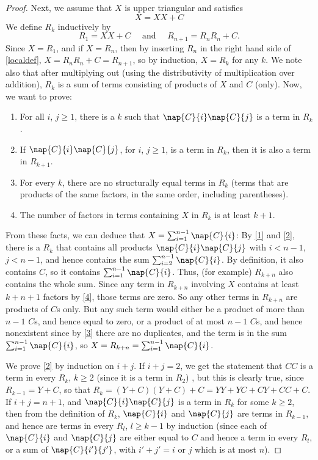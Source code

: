 \begin{proof}
   Next, we assume that $X$ is upper triangular and satisfies 
   \begin{equation*}
     \label{localdef}
     X = XX + C 
   \end{equation*}
   We define $R_k$ inductively by
   \begin{equation*}
     R_1 = XX + C \quad \text{ and } \quad R_{n + 1} = R_nR_n + C.
   \end{equation*}
   Since $X = R_1$, and if $X = R_n$, then by inserting $R_n$ in the right hand side of \eqref{localdef}, $X = R_nR_n + C = R_{n + 1}$, so by induction, $X = R_k$ for any $k$. We note also that after multiplying out (using the distributivity of multiplication over addition), $R_k$ is a sum of terms consisting of products of $X$ and $C$ (only). Now, we want to prove:
   \begin{enumerate}
   \item \label{1} For all $i$, $j \ge 1$, there is a $k$  such that $\nap{C}{i}\nap{C}{j}$ is a term in $R_k$.
   \item \label{2} If $\nap{C}{i}\nap{C}{j}$, for $i$, $j \ge 1$, is a term in $R_k$, then it is also a term in $R_{k + 1}$.
   \item \label{3} For every $k$, there are no structurally equal terms in $R_k$ (terms that are products of the same factors, in the same order, including parentheses).
   \item \label{4} The number of factors in terms containing $X$ in $R_k$ is at least $k + 1$. 
   \end{enumerate}
   From these facts, we can deduce that $X = \sum_{i = 1}^{n-1}\nap{C}{i}$: By \ref{1} and \ref{2}, there is a $R_k$ that contains all products $\nap{C}{i}\nap{C}{j}$ with $i < n - 1$, $j < n - 1$, and hence contains the sum $\sum_{i = 2}^{n-1}\nap{C}{i}$. By definition, it also contains $C$, so it contains $\sum_{i = 1}^{n-1}\nap{C}{i}$. Thus, (for example) $R_{k + n}$ also contains the whole sum. Since any term in $R_{k + n}$ involving $X$ contains at least $k + n + 1$ factors by \ref{4}, those terms are zero. So any other terms in $R_{k + n}$ are products of $C$s only. But any such term would either be a product of more than $n-1$  $C$s, and hence equal to zero, or a product of at most $n-1$ $C$s, and hence nonexistent since by \ref{3} there are no duplicates, and the term is in the sum $\sum_{i = 1}^{n-1}\nap{C}{i}$, so $X = R_{k + n} = \sum_{i = 1}^{n-1}\nap{C}{i}$.

We prove \ref{2} by induction on $i + j$. If $i+j = 2$, we get the statement that $CC$ is a term in every $R_k$, $k \ge 2$ (since it is a term in $R_2$) , but this is clearly true, since $R_{k - 1} = Y + C$, so that $R_{k} = (Y + C)(Y + C) + C = YY + YC + CY + CC + C$. If $i + j = n + 1$, and $\nap{C}{i}\nap{C}{j}$ is a term in $R_{k}$ for some $k \ge 2$, then from the definition of $R_k$, $\nap{C}{i}$ and $\nap{C}{j}$ are terms in $R_{k-1}$, and hence are terms in every $R_l$, $l \ge k-1$ by induction (since each of $\nap{C}{i}$ and $\nap{C}{j}$ are either equal to $C$ and hence a term in every $R_l$, or a sum of $\nap{C}{i'}{j'}$, with $i' + j' = i$ or $j$ which is at most $n$).


\end{proof}
